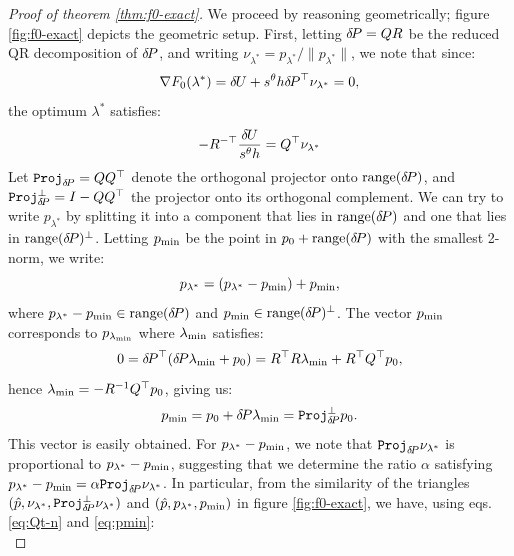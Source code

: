 \documentclass[smallcondensed]{svjour3}
\begin{document}
\begin{proof}[Proof of theorem \ref{thm:f0-exact}]
  We proceed by reasoning geometrically; figure \ref{fig:f0-exact}
  depicts the geometric setup. First, letting ${\delta \hspace{-0.14em} P} = QR$ be the
  reduced QR decomposition of ${\delta \hspace{-0.14em} P}$, and writing
  $\nu_{\lambda^*} = p_{\lambda^*}/\|p_{\lambda^*}\|$, we note that since:
  \begin{equation}
    \nabla F_0(\lambda^*) = {\delta \hspace{-0.09em} U} + s^\theta h {\delta \hspace{-0.14em} P}^\top \nu_{\lambda^*} = 0,
  \end{equation}
  the optimum $\lambda^*$ satisfies:
  \begin{equation}\label{eq:Qt-n}
    - R^{-\top} \frac{{\delta \hspace{-0.09em} U}}{s^\theta h} = Q^\top \nu_{\lambda^*}
  \end{equation}
  Let $\mathtt{Proj}_{{\delta \hspace{-0.14em} P}} = QQ^\top$ denote the orthogonal
  projector onto $\operatorname{range}({\delta \hspace{-0.14em} P})$, and
  $\mathtt{Proj}^\perp_{{\delta \hspace{-0.14em} P}} = I - QQ^\top$ the projector onto its
  orthogonal complement. We can try to write $p_{\lambda^*}$ by
  splitting it into a component that lies in $\operatorname{range}({\delta \hspace{-0.14em} P})$ and
  one that lies in $\operatorname{range}({\delta \hspace{-0.14em} P})^\perp$. Letting $p_{\operatorname{min}}$ be the
  point in $p_0 + \operatorname{range}({\delta \hspace{-0.14em} P})$ with the smallest 2-norm, we
  write:
  \begin{equation}\label{eq:plam-decomp}
    p_{\lambda^*} = (p_{\lambda^*} - p_{\operatorname{min}}) + p_{\operatorname{min}},
  \end{equation}
  where $p_{\lambda^*} - p_{\operatorname{min}} \in \operatorname{range}({\delta \hspace{-0.14em} P})$ and
  $p_{\operatorname{min}} \in \operatorname{range}({\delta \hspace{-0.14em} P})^\perp$. The vector $p_{\operatorname{min}}$ corresponds to
  $p_{\lambda_{\operatorname{min}}}$ where $\lambda_{\operatorname{min}}$ satisfies:
  \begin{equation}
    0 = {\delta \hspace{-0.14em} P}^\top ({\delta \hspace{-0.14em} P} \lambda_{\operatorname{min}} + p_0) = R^\top R \lambda_{\operatorname{min}} + R^\top Q^\top p_0,
  \end{equation}
  hence $\lambda_{\operatorname{min}} = -R^{-1} Q^\top p_0$, giving us:
  \begin{equation}\label{eq:pmin}
    p_{\operatorname{min}} = p_0 + {\delta \hspace{-0.14em} P} \lambda_{\operatorname{min}} = \mathtt{Proj}^\perp_{{\delta \hspace{-0.14em} P}} p_0.
  \end{equation}
  This vector is easily obtained. For $p_{\lambda^*} - p_{\operatorname{min}}$, we note
  that $\mathtt{Proj}_{{\delta \hspace{-0.14em} P}} \nu_{\lambda^*}$ is proportional to
  $p_{\lambda^*} - p_{\operatorname{min}}$, suggesting that we determine the ratio
  $\alpha$ satisfying
  $p_{\lambda^*} - p_{\operatorname{min}} = \alpha \mathtt{Proj}_{{\delta \hspace{-0.14em} P}}
  \nu_{\lambda^*}$. In particular, from the similarity of the
  triangles
  $(\hat{p}, \nu_{\lambda^*}, \mathtt{Proj}^\perp_{{\delta \hspace{-0.14em} P}}
  \nu_{\lambda^*})$ and $(\hat{p}, p_{\lambda^*}, p_{\operatorname{min}})$ in figure
  \ref{fig:f0-exact}, we have, using eqs.\@ \ref{eq:Qt-n} and
  \ref{eq:pmin}:
  \begin{equation}\label{eq:alpha-solve}

\end{equation}
\end{proof}
\end{document}
